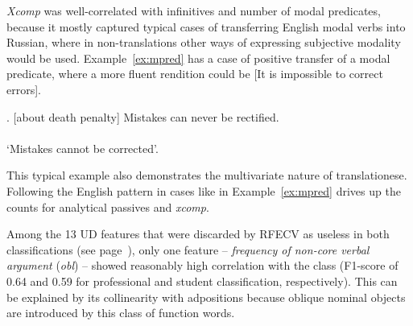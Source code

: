 \textit{Xcomp} was well-correlated with infinitives and number of modal predicates, because it mostly captured typical cases of transferring English modal verbs into Russian, where in non-translations other ways of expressing subjective modality would be used. Example~\ref{ex:mpred} has a case of positive transfer of a modal predicate, where a more fluent rendition could be  [It is impossible to correct errors]. 

\ex. \label{ex:mpred}\hspace{1pt}
[about death penalty] Mistakes can never be rectified.\\
\\
`Mistakes cannot be corrected'.

This typical example also demonstrates the multivariate nature of translationese. Following the English pattern in cases like in Example~\ref{ex:mpred} drives up the counts for analytical passives and \textit{xcomp}.

Among the 13 UD features that were discarded by RFECV as useless in both classifications (see page~\pageref{pg:rfe_useless}), only one feature -- \textit{frequency of non-core verbal argument} (\textit{obl}) -- showed reasonably high correlation with the class (F1-score of 0.64 and 0.59 for professional and student classification, respectively). This can be explained by its collinearity with adpositions because oblique nominal objects are introduced by this class of function words. 




